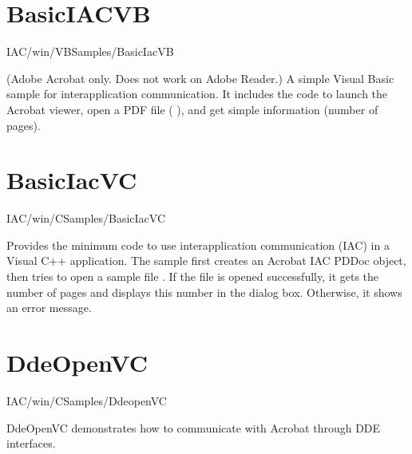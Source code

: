 \documentclass[letterpaper,12pt,english,openany,oneside]{sphinxmanual}
\begin{document}
\section{BasicIACVB}
\label{\detokenize{Samples_WindowsIAC:basiciacvb}}\label{\detokenize{Samples_WindowsIAC:location-8}}

IAC/win/VBSamples/BasicIacVB

\label{\detokenize{Samples_WindowsIAC:description-8}}

(Adobe Acrobat only. Does not work on Adobe Reader.) A simple Visual Basic sample for interapplication communication. It includes the code to launch the Acrobat viewer, open a PDF file ( ), and get simple information (number of pages).


\section{BasicIacVC}
\label{\detokenize{Samples_WindowsIAC:basiciacvc}}\label{\detokenize{Samples_WindowsIAC:location-9}}

IAC/win/CSamples/BasicIacVC

\label{\detokenize{Samples_WindowsIAC:description-9}}

Provides the minimum code to use interapplication communication (IAC) in a Visual C++ application. The sample first creates an Acrobat IAC PDDoc object, then tries to open a sample file  . If the file is opened successfully, it gets the number of pages and displays this number in the dialog box. Otherwise, it shows an error message.


\section{DdeOpenVC}
\label{\detokenize{Samples_WindowsIAC:ddeopenvc}}\label{\detokenize{Samples_WindowsIAC:location-10}}

IAC/win/CSamples/DdeopenVC

\label{\detokenize{Samples_WindowsIAC:description-10}}

DdeOpenVC demonstrates how to communicate with Acrobat through DDE interfaces.
\end{document}
